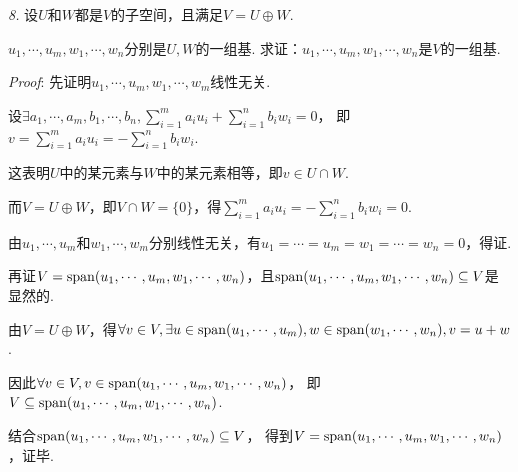 \textit{8.}
设$U$和$W$都是$V$的子空间，且满足$V=U \oplus W$.

$u_1,\cdots,u_m,w_1,\cdots,w_n$分别是$U,W$的一组基.
求证：$u_1,\cdots,u_m,w_1,\cdots,w_n$是$V$的一组基.

\textit{Proof}:
先证明$u_1,\cdots,u_m,w_1,\cdots,w_m$线性无关.

设$\exists a_1,\cdots,a_m,b_1,\cdots,b_n,\sum_{i=1}^m a_iu_i+\sum_{i=1}^n b_iw_i=0$，
即$v=\sum_{i=1}^m a_iu_i=-\sum_{i=1}^n b_iw_i$.

这表明$U$中的某元素与$W$中的某元素相等，即$v\in U\cap W$.

而$V=U\oplus W$，即$V\cap W=\{0\}$，得$\sum_{i=1}^m a_iu_i=-\sum_{i=1}^n b_iw_i=0$.

由$u_1,\cdots,u_m$和$w_1,\cdots,w_m$分别线性无关，有$u_1=\cdots=u_m=w_1=\cdots=w_n=0$，得证.

再证$V=\mathrm{span}(u_1,\cdots,u_m,w_1,\cdots,w_n)$，且$\mathrm{span}(u_1,\cdots,u_m,w_1,\cdots,w_n) \subseteq V$是显然的.

由$V=U\oplus W$，得$\forall v\in V,\exists u \in \mathrm{span}(u_1,\cdots,u_m),w \in \mathrm{span}(w_1,\cdots,w_n),v=u+w$.

因此$\forall v \in V,v \in \mathrm{span} (u_1,\cdots,u_m,w_1,\cdots,w_n)$，
即$V \subseteq \mathrm{span}(u_1,\cdots,u_m,w_1,\cdots,w_n)$.

结合$\mathrm{span}(u_1,\cdots,u_m,w_1,\cdots,w_n) \subseteq V$，
得到$V=\mathrm{span} (u_1,\cdots,u_m,w_1,\cdots,w_n)$，证毕.


